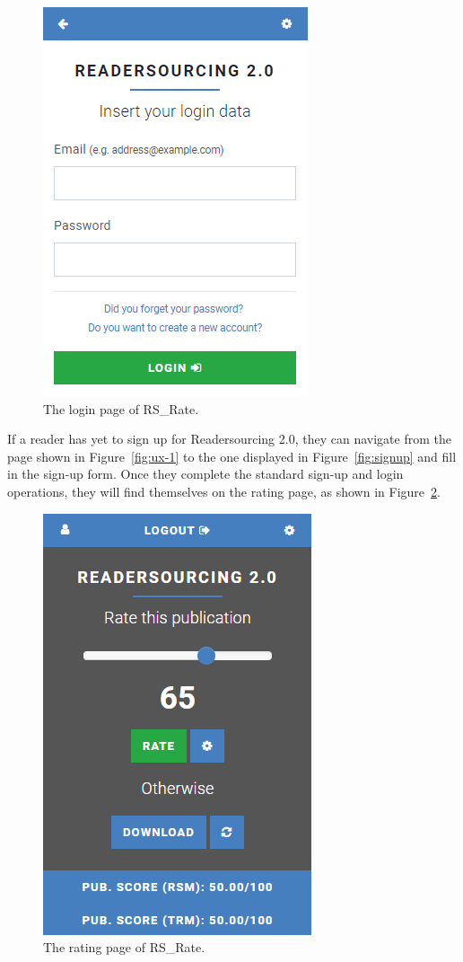 \documentclass[a4paper, english]{article}
\newcommand{\rsrate}{RS\_Rate\xspace}
\begin{document}
\begin{figure}
\centering
\includegraphics[scale=0.7]{figures/login.png}
\caption{The login page of \rsrate.}
\label{fig:login}
\end{figure}

If a reader has yet to sign up for Readersourcing 2.0, they can navigate from the page shown in Figure~\ref{fig:ux-1} to the one displayed in Figure~\ref{fig:signup} and fill in the sign-up form. Once they complete the standard sign-up and login operations, they will find themselves on the rating page, as shown in Figure~\ref{fig:rating-1}.

\begin{figure}
\centering
\includegraphics[scale=0.7]{figures/rating-2.PNG}
\caption{The rating page of \rsrate.}
\label{fig:rating-1}
\end{figure}
\end{document}
